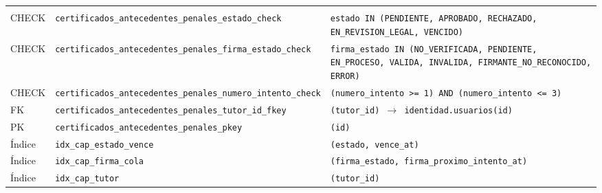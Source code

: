 {\small
\begin{xltabular}{\textwidth}{@{}>{\raggedright\arraybackslash}p{1.7cm} >{\raggedright\arraybackslash}p{4.6cm} L@{}}
    \toprule
     &  &  \\
    \midrule
    \endfirsthead
    \toprule
     &  &  \\
    \midrule
    \endhead
    \bottomrule
    \endfoot
    CHECK & \texttt{certificados\_\allowbreak{}antecedentes\_\allowbreak{}penales\_\allowbreak{}estado\_\allowbreak{}check} & \texttt{estado IN (\allowbreak{}\textquotesingle{}PENDIENTE\textquotesingle{},\allowbreak{} \textquotesingle{}APROBADO\textquotesingle{},\allowbreak{} \textquotesingle{}RECHAZADO\textquotesingle{},\allowbreak{} \textquotesingle{}EN\_\allowbreak{}REVISION\_\allowbreak{}LEGAL\textquotesingle{},\allowbreak{} \textquotesingle{}VENCIDO\textquotesingle{})} \\
    CHECK & \texttt{certificados\_\allowbreak{}antecedentes\_\allowbreak{}penales\_\allowbreak{}firma\_\allowbreak{}estado\_\allowbreak{}check} & \texttt{firma\_\allowbreak{}estado IN (\allowbreak{}\textquotesingle{}NO\_\allowbreak{}VERIFICADA\textquotesingle{},\allowbreak{} \textquotesingle{}PENDIENTE\textquotesingle{},\allowbreak{} \textquotesingle{}EN\_\allowbreak{}PROCESO\textquotesingle{},\allowbreak{} \textquotesingle{}VALIDA\textquotesingle{},\allowbreak{} \textquotesingle{}INVALIDA\textquotesingle{},\allowbreak{} \textquotesingle{}FIRMANTE\_\allowbreak{}NO\_\allowbreak{}RECONOCIDO\textquotesingle{},\allowbreak{} \textquotesingle{}ERROR\textquotesingle{})} \\
    CHECK & \texttt{certificados\_\allowbreak{}antecedentes\_\allowbreak{}penales\_\allowbreak{}numero\_\allowbreak{}intento\_\allowbreak{}check} & \texttt{(\allowbreak{}numero\_\allowbreak{}intento \textgreater{}= 1) AND (\allowbreak{}numero\_\allowbreak{}intento \textless{}= 3)} \\
    FK & \texttt{certificados\_\allowbreak{}antecedentes\_\allowbreak{}penales\_\allowbreak{}tutor\_\allowbreak{}id\_\allowbreak{}fkey} & \texttt{(\allowbreak{}tutor\_\allowbreak{}id) $\rightarrow$ identidad.usuarios(\allowbreak{}id)} \\
    PK & \texttt{certificados\_\allowbreak{}antecedentes\_\allowbreak{}penales\_\allowbreak{}pkey} & \texttt{(\allowbreak{}id)} \\
    Índice & \texttt{idx\_\allowbreak{}cap\_\allowbreak{}estado\_\allowbreak{}vence} & \texttt{(\allowbreak{}estado,\allowbreak{} vence\_\allowbreak{}at)} \\
    Índice & \texttt{idx\_\allowbreak{}cap\_\allowbreak{}firma\_\allowbreak{}cola} & \texttt{(\allowbreak{}firma\_\allowbreak{}estado,\allowbreak{} firma\_\allowbreak{}proximo\_\allowbreak{}intento\_\allowbreak{}at)} \\
    Índice & \texttt{idx\_\allowbreak{}cap\_\allowbreak{}tutor} & \texttt{(\allowbreak{}tutor\_\allowbreak{}id)} \\
\end{xltabular}
}

